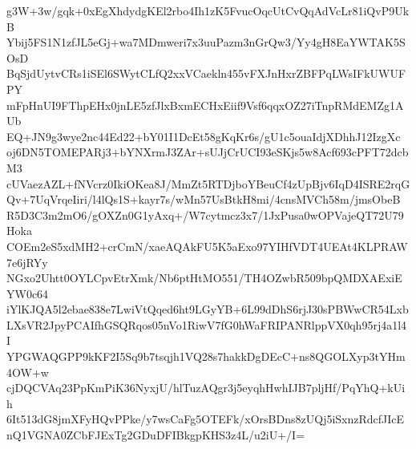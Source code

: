 g3W+3w/gqk+0xEgXhdydgKEl2rbo4Ih1zK5FvucOqcUtCvQqAdVcLr81iQvP9UkB
Ybij5FS1N1zfJL5eGj+wa7MDmweri7x3uuPazm3nGrQw3/Yy4gH8EaYWTAK5SOsD
BqSjdUytvCRs1iSEl6SWytCLfQ2xxVCaekln455vFXJnHxrZBFPqLWsIFkUWUFPY
mFpHnUI9FThpEHx0jnLE5zfJlxBxmECHxEiif9Vsf6qqxOZ27iTnpRMdEMZg1AUb
EQ+JN9g3wye2nc44Ed22+bY01I1DcEt58gKqKr6s/gU1c5ouaIdjXDhhJ12IzgXc
oj6DN5TOMEPARj3+bYNXrmJ3ZAr+sUJjCrUCI93eSKjs5w8Acf693cPFT72dcbM3
cUVaezAZL+fNVcrz0IkiOKea8J/MmZt5RTDjboYBeuCf4zUpBjv6IqD4ISRE2rqG
Qv+7UqVrqeIiri/l4lQs1S+kayr7s/wMn57UsBtkH8mi/4cnsMVCh58m/jmsObeB
R5D3C3m2mO6/gOXZn0G1yAxq+/W7cytmcz3x7/1JxPusa0wOPVajeQT72U79Hoka
COEm2eS5xdMH2+crCmN/xaeAQAkFU5K5aExo97YIHfVDT4UEAt4KLPRAW7e6jRYy
NGxo2Uhtt0OYLCpvEtrXmk/Nb6ptHtMO551/TH4OZwbR509bpQMDXAExiEYW0c64
iYlKJQA5l2ebae838e7LwiVtQqed6ht9LGyYB+6L99dDhS6rjJ30sPBWwCR54Lxb
LXsVR2JpyPCAIfhGSQRqos05nVo1RiwV7fG0hWaFRIPANRlppVX0qh95rj4a1l4I
YPGWAQGPP9kKF2I5Sq9b7tsqjh1VQ28s7hakkDgDEcC+ns8QGOLXyp3tYHm4OW+w
cjDQCVAq23PpKmPiK36NyxjU/hlTuzAQgr3j5eyqhHwhIJB7pljHf/PqYhQ+kUih
6It513dG8jmXFyHQvPPke/y7wsCaFg5OTEFk/xOrsBDns8zUQj5iSxnzRdcfJIcE
nQ1VGNA0ZCbFJExTg2GDuDFIBkgpKHS3z4L/u2iU+/I=
